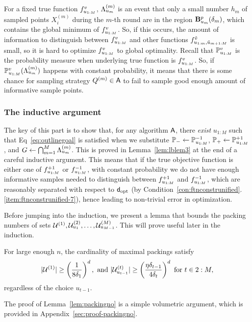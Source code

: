 For a fixed true function $f_{u_{1:M}}^v$, $\Lambda_{u_{m}}^{({m})}$ is an event that only a small number $h_m$ of 
sampled points $X_i^{(m)}$ during the $m$-th round are in the region $\mathbf{B}^p_{u_{m}}({\delta_{m}})$,
which contains the global minimum of $f_{u_{1:M}}^v$.
So, if this occurs, the amount of information to distinguish between $f_{u_{1:M}}^v$ and other functions $f_{u_{1:m}, \tilde u_{m+1:M}}^{\tilde v}$ is small, so it is hard to optimize $f_{u_{1:M}}^v$ to global optimality.
Recall that $\mathbb{P}_{u_{1:M}}^v$ is the probability measure when underlying true function is $f_{u_{1:M}}^v$.
So, if $\mathbb{P}_{u_{1:M}}^v(\Lambda_{u_{m}}^{({m})})$ happens with constant probability, it means that there is some chance for
sampling strategy $Q^{({m})} \in \mathsf{A}$ to fail to sample good enough amount of informative sample points.

\subsubsection{The inductive argument}
\label{sec:proof-lbmain-induct}

The key of this part is to show that, for any algorithm $\mathsf{A}$,
there \emph{exist} $u_{1:M}$ such that Eq~\eqref{eq:outlinegoal} is satisfied when we substitute $\mathbb{P}_- \leftarrow \mathbb{P}_{u_{1:M}}^{-1}$, $\mathbb{P}_+ \leftarrow \mathbb{P}_{u_{1:M}}^{+1}$, and $G \leftarrow \bigcap_{m=1}^{M} \Lambda_{u_{m}}^{({m})}$. This is proved in Lemma~\ref{lem:lblem3} at the end of a careful inductive argument. 
This means that if the true objective function is either one of $f_{u_{1:M}}^{+1}$ or $f_{u_{1:M}}^{-1}$,
with constant probability we do not have enough informative samples needed to 
distinguish between $f_{u_{1:M}}^{+1}$ and $f_{u_{1:M}}^{-1}$, which are reasonably separated with respect to $\fndist$ (by Condition~\ref{con:ftnconstrunified}.\ref{item:ftnconstrunified-7}), hence leading to non-trivial error in optimization.

Before jumping into the induction, we present a lemma that bounds the packing numbers of sets $\mathcal{U}^{(1)}, \mathcal{U}^{({2})}_{u_{1}}, \dots, \mathcal{U}^{({M})}_{u_{M-1}}$. This will prove useful later in the induction.
\begin{lemma}
	\label{lem:packingno}
	For large enough $n$, the cardinality of maximal packings satisfy
	\begin{equation*}
		| \mathcal{U}^{(1)} | \geq \left(\frac{1}{8\delta_1} \right)^d, \text{ and }
		| \mathcal{U}^{({t})}_{u_{t-1}} | \geq \left( \frac{\eta \delta_{t-1}}{4\delta_t} \right )^d \text{ for } t \in 2:M,
	\end{equation*}
	regardless of the choice $u_{t-1}$.
\end{lemma}
The proof of Lemma~\ref{lem:packingno} is a simple volumetric argument, which is provided in Appendix~\ref{sec:proof-packingno}.


